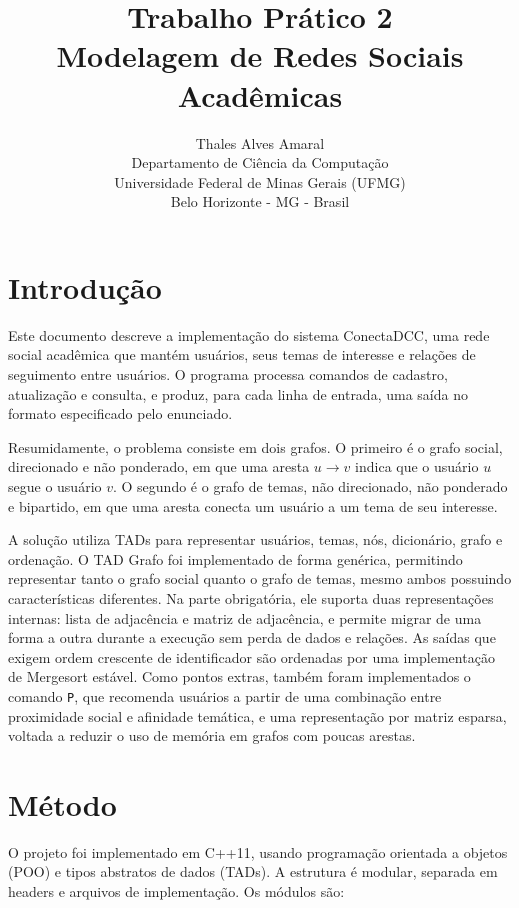 \documentclass[12pt,a4paper]{article}
\title{Trabalho Prático 2 \\ Modelagem de Redes Sociais Acadêmicas}
\author{Thales Alves Amaral \\ \small{Departamento de Ciência da Computação} \\ \small{Universidade Federal de Minas Gerais (UFMG)} \\ \small{Belo Horizonte - MG - Brasil}}
\date{}
\begin{document}
\maketitle

\section{Introdução}

Este documento descreve a implementação do sistema ConectaDCC, uma rede social acadêmica que mantém usuários, seus temas de interesse e relações de seguimento entre usuários. O programa processa comandos de cadastro, atualização e consulta, e produz, para cada linha de entrada, uma saída no formato especificado pelo enunciado.

Resumidamente, o problema consiste em dois grafos. O primeiro é o grafo social, direcionado e não ponderado, em que uma aresta $u \rightarrow v$ indica que o usuário $u$ segue o usuário $v$. O segundo é o grafo de temas, não direcionado, não ponderado e bipartido, em que uma aresta conecta um usuário a um tema de seu interesse.

A solução utiliza TADs para representar usuários, temas, nós, dicionário, grafo e ordenação. O TAD Grafo foi implementado de forma genérica, permitindo representar tanto o grafo social quanto o grafo de temas, mesmo ambos possuindo características diferentes. Na parte obrigatória, ele suporta duas representações internas: lista de adjacência e matriz de adjacência, e permite migrar de uma forma a outra durante a execução sem perda de dados e relações. As saídas que exigem ordem crescente de identificador são ordenadas por uma implementação de Mergesort estável. Como pontos extras, também foram implementados o comando \texttt{P}, que recomenda usuários a partir de uma combinação entre proximidade social e afinidade temática, e uma representação por matriz esparsa, voltada a reduzir o uso de memória em grafos com poucas arestas.

\section{Método}

O projeto foi implementado em C++11, usando programação orientada a objetos (POO) e
tipos abstratos de dados (TADs). A estrutura é modular, separada em headers e arquivos
de implementação. Os módulos são:
\end{document}
